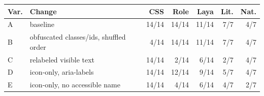 \begin{tabular}{llrrrrr}
\toprule
Var. & Change & CSS & Role & Laya & \multicolumn{1}{c}{Lit.} & \multicolumn{1}{c}{Nat.} \\
\midrule
A & baseline & 14/14 & 14/14 & 11/14 & 7/7 & 4/7 \\
B & obfuscated classes/ids, shuffled order & 4/14 & 14/14 & 11/14 & 7/7 & 4/7 \\
C & relabeled visible text & 14/14 & 2/14 & 6/14 & 2/7 & 4/7 \\
D & icon-only, aria-labels & 14/14 & 12/14 & 9/14 & 5/7 & 4/7 \\
E & icon-only, no accessible name & 14/14 & 4/14 & 6/14 & 4/7 & 2/7 \\
\bottomrule
\end{tabular}
